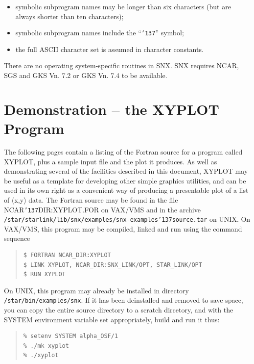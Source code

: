 \documentclass[11pt]{article}
\renewcommand{\_}{{\tt\char'137}}     %
\begin{document}
\begin {itemize}
\item symbolic subprogram names may be longer than six characters (but are 
always shorter than ten characters);
\item symbolic subprogram names include the ``\_'' symbol;
\item the full ASCII character set is assumed in character constants.
\end {itemize}

There are no operating system-specific routines in SNX.
SNX requires NCAR, SGS and GKS Vn. 7.2 or GKS Vn. 7.4 to be available.


\section {Demonstration -- the XYPLOT Program} \label{demo1_sect}
 
The following pages contain a listing of the Fortran source for a
program called XYPLOT, plus a sample input file and the plot it
produces.  As well as demonstrating several of the facilities described
in this document, XYPLOT may be useful as a template for developing
other simple graphics utilities, and can be used in its own right as a
convenient way of producing a presentable plot of a list of (x,y)
data.  The Fortran source may be found in the file NCAR\_DIR:XYPLOT.FOR
on VAX/VMS and in the archive {\tt
/star/\-starlink/\-lib/\-snx/\-examples/\-snx-examples\_source.tar} on
UNIX.  On VAX/VMS, this program may be compiled, linked and run using
the command sequence

\begin {quote}
\begin{verbatim}
$ FORTRAN NCAR_DIR:XYPLOT
$ LINK XYPLOT, NCAR_DIR:SNX_LINK/OPT, STAR_LINK/OPT
$ RUN XYPLOT
\end{verbatim}
\end {quote}

On UNIX, this program may already be installed in directory 
{\tt /star/bin/examples/snx}.  If it has been deinstalled and removed to save
space, you can copy the entire source directory to a scratch dircetory, and
with the SYSTEM environment variable set appropriately, build and run it thus:

\begin {quote}
\begin{verbatim}
% setenv SYSTEM alpha_OSF/1
% ./mk xyplot
% ./xyplot
\end{verbatim}
\end {quote}
\end{document}
